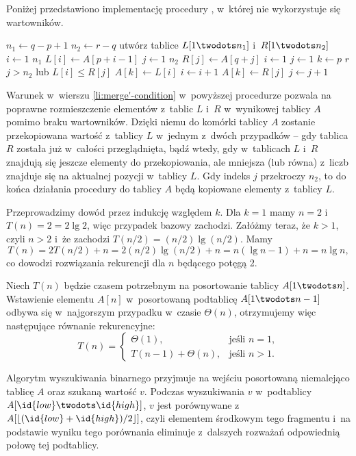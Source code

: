 \exercise %
Poniżej przedstawiono implementację procedury , w~której nie wykorzystuje się wartowników.
\begin{codebox}
\li	$n_1\gets q-p+1$
\li	$n_2\gets r-q$
\li	utwórz tablice $L[1\twodots n_1]$ i~$R[1\twodots n_2]$
\li	\For $i\gets1$ \To $n_1$
\li		\Do $L[i]\gets A[p+i-1]$
		\End
\li	\For $j\gets1$ \To $n_2$
\li		\Do $R[j]\gets A[q+j]$
		\End
\li	$i\gets1$
\li $j\gets1$
\li \For $k\gets p$ \To $r$
\li		\Do
			\If $j>n_2$ lub $L[i]\le R[j]$ \label{li:merge'-condition}
\li				\Then
					$A[k]\gets L[i]$
\li					$i\gets i+1$
\li				\Else
					$A[k]\gets R[j]$
\li					$j\gets j+1$
				\End
		\End
\end{codebox}
Warunek w~wierszu \ref{li:merge'-condition} w~powyższej procedurze pozwala na poprawne rozmieszczenie elementów z~tablic $L$ i~$R$ w~wynikowej tablicy $A$ pomimo braku wartowników.
Dzięki niemu do  komórki tablicy $A$ zostanie przekopiowana wartość z~tablicy $L$ w~jednym z~dwóch przypadków -- gdy tablica $R$ została już w~całości przeglądnięta, bądź wtedy, gdy w~tablicach $L$ i~$R$ znajdują się jeszcze elementy do przekopiowania, ale mniejsza (lub równa) z~liczb znajduje się na aktualnej pozycji w~tablicy $L$.
Gdy indeks $j$ przekroczy $n_2$, to do końca działania procedury do tablicy $A$ będą kopiowane elementy z~tablicy $L$.

\exercise %
Przeprowadzimy dowód przez indukcję względem $k$.
Dla $k=1$ mamy $n=2$ i~$T(n)=2=2\lg2$, więc przypadek bazowy zachodzi.
Załóżmy teraz, że $k>1$, czyli $n>2$ i~że zachodzi $T(n/2)=(n/2)\lg(n/2)$.
Mamy
\[
	T(n) = 2T(n/2)+n = 2(n/2)\lg(n/2)+n = n(\lg n-1)+n = n\lg n,
\]
co dowodzi rozwiązania rekurencji dla $n$ będącego potęgą 2.

\exercise %
Niech $T(n)$ będzie czasem potrzebnym na posortowanie tablicy $A[1\twodots n]$.
Wstawienie elementu $A[n]$ w~posortowaną podtablicę $A[1\twodots n-1]$ odbywa się w~najgorszym przypadku w~czasie $\Theta(n)$, otrzymujemy więc następujące równanie rekurencyjne:
\[
	T(n) =
	\begin{cases}
		\Theta(1), & \text{jeśli $n=1$}, \\
		T(n-1)+\Theta(n), & \text{jeśli $n>1$}.
	\end{cases}
\]

\exercise %
Algorytm wyszukiwania binarnego przyjmuje na wejściu posortowaną niemalejąco tablicę $A$ oraz szukaną wartość $v$.
Podczas wyszukiwania $v$ w~podtablicy $A[\id{low}\twodots\id{high}]$, $v$ jest porównywane z~$A[\lfloor(\id{low}+\id{high})/2\rfloor]$, czyli elementem środkowym tego fragmentu i~na podstawie wyniku tego porównania eliminuje z~dalszych rozważań odpowiednią połowę tej podtablicy.

